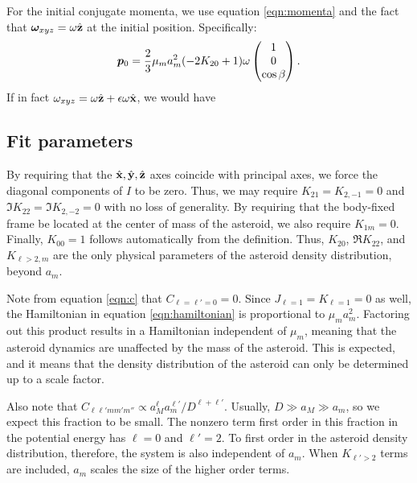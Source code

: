 \documentclass[11pt]{article}
\begin{document}
For the initial conjugate momenta, we use equation \ref{eqn:momenta} and the fact that $\bm \omega_{xyz}=\omega \hat{\mathbf{z}}$ at the initial position. Specifically:
\begin{equation}
\bm p_0 = \frac{2}{3}\mu_m a_m^2 (-2K_{20}+1) \omega \left( \begin{matrix}1 \\0 \\ \cos \beta\end{matrix} \right).
\end{equation}
If in fact $\omega_{xyz} = \omega \hat{\mathbf{z}} + \epsilon \omega \hat{\mathbf{x}}$, we would have

\subsection{Fit parameters}
By requiring that the $\hat{\mathbf{x}}, \hat{\mathbf{y}}, \hat{\mathbf{z}}$ axes coincide with principal axes, we force the diagonal components of $I$ to be zero. Thus, we may require $K_{21}=K_{2,-1}=0$ and $\Im K_{22}=\Im K_{2,-2}=0$ with no loss of generality. By requiring that the body-fixed frame be located at the center of mass of the asteroid, we also require $K_{1m}=0$. Finally, $K_{00}=1$ follows automatically from the definition. Thus, $K_{20}$, $\Re K_{22}$, and $K_{\ell>2, m}$ are the only physical parameters of the asteroid density distribution, beyond $a_m$.

Note from equation \ref{eqn:c} that $C_{\ell=\ell'=0}=0$. Since $J_{\ell=1}=K_{\ell=1} = 0$ as well, the Hamiltonian in equation \ref{eqn:hamiltonian} is proportional to $\mu_m a_m^2$. Factoring out this product results in a Hamiltonian independent of $\mu_m$, meaning that the asteroid dynamics are unaffected by the mass of the asteroid. This is expected, and it means that the density distribution of the asteroid can only be determined up to a scale factor.

Also note that $C_{\ell \ell' m m' m''} \propto a_M^\ell a_m^{\ell'} / D^{\ell+\ell'}$. Usually, $D \gg a_M \gg a_m$, so we expect this fraction to be small. The nonzero term first order in this fraction in the potential energy has $\ell = 0$ and $\ell'=2$. To first order in the asteroid density distribution, therefore, the system is also independent of $a_m$. When $K_{\ell' > 2}$ terms are included, $a_m$ scales the size of the higher order terms.
\end{document}
